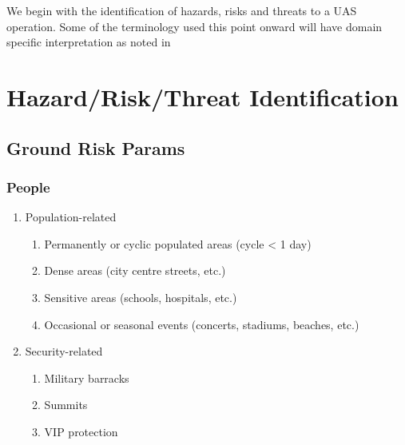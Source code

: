 \documentclass{ua_wgs_base}
\begin{document}
We begin with the identification of hazards, risks and threats to
a UAS operation. Some of the terminology used this point onward will
have domain specific interpretation as noted in 

\section{Hazard/Risk/Threat Identification}

\subsection{Ground Risk Params}

\subsubsection{People}
\begin{enumerate}
\item Population-related
\begin{enumerate}
\item Permanently or cyclic populated areas (cycle < 1 day)
\item Dense areas (city centre streets, etc.)
\item Sensitive areas (schools, hospitals, etc.)
\item Occasional or seasonal events (concerts, stadiums, beaches, etc.)
\end{enumerate}
\item Security-related
\begin{enumerate}
\item Military barracks
\item Summits
\item VIP protection
\end{enumerate}
\end{enumerate}
\end{document}
